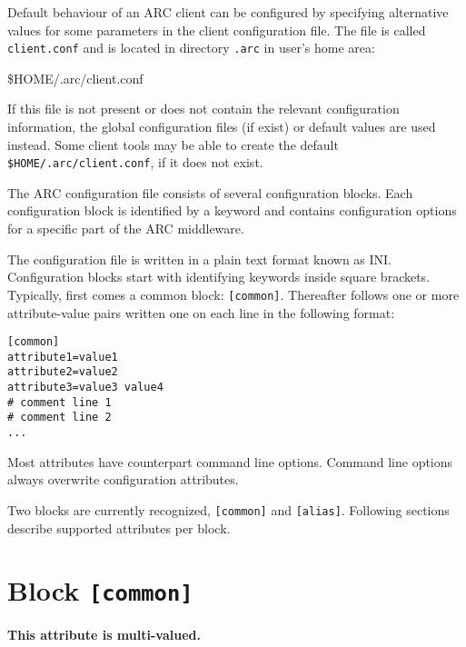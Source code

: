 Default behaviour of an ARC client can be configured by specifying
alternative values for some parameters in the client configuration
file. The file is called \texttt{client.conf} and is located in
directory \texttt{.arc} in user's home area:
\begin{shaded}
 {\$}HOME/.arc/client.conf
\end{shaded}
If this file is not present or does not contain the relevant
configuration information, the global configuration files (if exist)
or default values are used instead. Some client tools may be able to create
the default \texttt{{\$}HOME/.arc/client.conf}, if it does not exist.

The ARC configuration file consists of several configuration blocks.
Each configuration block is identified by a keyword and contains
configuration options for a specific part of the ARC middleware.

The configuration file is written in a plain text format known as INI.
Configuration blocks start with identifying keywords inside square brackets.
Typically, first comes a common block: \verb#[common]#. Thereafter follows one
or more attribute-value pairs written one on each line in the following
format:

\begin{framed}
\begin{verbatim}
[common]
attribute1=value1
attribute2=value2
attribute3=value3 value4
# comment line 1
# comment line 2
...
\end{verbatim}
\end{framed}


Most attributes have counterpart command line options. Command line options
always overwrite configuration attributes.

Two blocks are currently recognized, \texttt{[common]} and
\texttt{[alias]}. Following sections describe supported attributes per block.

\section{Block \texttt{[common]}}

{}
\hspace*{0.5cm}
\begin{shaded}
\end{shaded}
\textbf{This attribute is multi-valued.}

